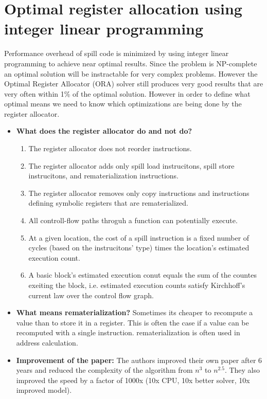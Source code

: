 \documentclass[a4paper,10pt]{article}
\begin{document}
\section{Optimal register allocation using integer linear programming}
Performance overhead of spill code is minimized by using integer linear programming to achieve near optimal results. Since the problem is 
NP-complete an optimal solution will be instractable for very complex problems. However the Optimal Register Allocator (ORA) solver still 
produces very good results that are very often within 1\% of the optimal solution. However in order to define what optimal means we need 
to know which optimizations are being done by the register allocator.
\\
\begin{itemize}
 \item \textbf{What does the register allocator do and not do?}
\begin{enumerate}
 \item The register allocator does not reorder instructions.
 \item The register allocator adds only spill load instrucitons, spill store instrucitons, and rematerialization instructions.
 \item The register allocator removes only copy instructions and instructions defining symbolic registers that are rematerialized.
 \item All controll-flow paths throguh a function can potentially execute.
 \item At a given location, the cost of a spill instruction is a fixed number of cycles (based on the instrucitons' type) times the location's estimated execution count.
 \item A basic block's estimated execution conut equals the sum of the countes exeiting the block, i.e. estimated execution counts satisfy Kirchhoff's current law over the control flow graph.
\end{enumerate}

\item \textbf{What means rematerialization?} Sometimes its cheaper to recompute a value than to store it in a register. This is often the 
case if a value can be recomputed with a single instruction. rematerialization is often used in address calculation.
\item \textbf{Improvement of the paper:} The authors improved their own paper after 6 years and reduced the complexity of the algorithm from $n^3$ to $n^{2.5}$. They also improved the speed by a factor of 1000x (10x CPU, 10x better solver, 10x improved model).
\end{itemize}
\end{document}
